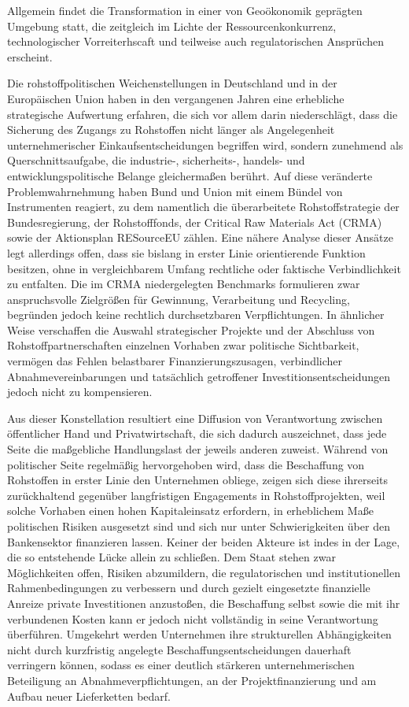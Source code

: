 \documentclass[12pt,a4paper,oneside]{book} %
\begin{document}
{Allgemein findet die Transformation in einer von Geoökonomik geprägten Umgebung statt, die zeitgleich im Lichte der Ressourcenkonkurrenz, technologischer Vorreiterhscaft und teilweise auch regulatorischen Ansprüchen erscheint.

Die rohstoffpolitischen Weichenstellungen in Deutschland und in der Europäischen Union haben in den vergangenen Jahren eine erhebliche strategische Aufwertung erfahren, die sich vor allem darin niederschlägt, dass die Sicherung des Zugangs zu Rohstoffen nicht länger als Angelegenheit unternehmerischer Einkaufsentscheidungen begriffen wird, sondern zunehmend als Querschnittsaufgabe, die industrie-, sicherheits-, handels- und entwicklungspolitische Belange gleichermaßen berührt. Auf diese veränderte Problemwahrnehmung haben Bund und Union mit einem Bündel von Instrumenten reagiert, zu dem namentlich die überarbeitete Rohstoffstrategie der Bundesregierung, der Rohstofffonds, der Critical Raw Materials Act (CRMA) sowie der Aktionsplan RESourceEU zählen. Eine nähere Analyse dieser Ansätze legt allerdings offen, dass sie bislang in erster Linie orientierende Funktion besitzen, ohne in vergleichbarem Umfang rechtliche oder faktische Verbindlichkeit zu entfalten. Die im CRMA niedergelegten Benchmarks formulieren zwar anspruchsvolle Zielgrößen für Gewinnung, Verarbeitung und Recycling, begründen jedoch keine rechtlich durchsetzbaren Verpflichtungen. In ähnlicher Weise verschaffen die Auswahl strategischer Projekte und der Abschluss von Rohstoffpartnerschaften einzelnen Vorhaben zwar politische Sichtbarkeit, vermögen das Fehlen belastbarer Finanzierungszusagen, verbindlicher Abnahmevereinbarungen und tatsächlich getroffener Investitionsentscheidungen jedoch nicht zu kompensieren.

Aus dieser Konstellation resultiert eine Diffusion von Verantwortung zwischen öffentlicher Hand und Privatwirtschaft, die sich dadurch auszeichnet, dass jede Seite die maßgebliche Handlungslast der jeweils anderen zuweist. Während von politischer Seite regelmäßig hervorgehoben wird, dass die Beschaffung von Rohstoffen in erster Linie den Unternehmen obliege, zeigen sich diese ihrerseits zurückhaltend gegenüber langfristigen Engagements in Rohstoffprojekten, weil solche Vorhaben einen hohen Kapitaleinsatz erfordern, in erheblichem Maße politischen Risiken ausgesetzt sind und sich nur unter Schwierigkeiten über den Bankensektor finanzieren lassen. Keiner der beiden Akteure ist indes in der Lage, die so entstehende Lücke allein zu schließen. Dem Staat stehen zwar Möglichkeiten offen, Risiken abzumildern, die regulatorischen und institutionellen Rahmenbedingungen zu verbessern und durch gezielt eingesetzte finanzielle Anreize private Investitionen anzustoßen, die Beschaffung selbst sowie die mit ihr verbundenen Kosten kann er jedoch nicht vollständig in seine Verantwortung überführen. Umgekehrt werden Unternehmen ihre strukturellen Abhängigkeiten nicht durch kurzfristig angelegte Beschaffungsentscheidungen dauerhaft verringern können, sodass es einer deutlich stärkeren unternehmerischen Beteiligung an Abnahmeverpflichtungen, an der Projektfinanzierung und am Aufbau neuer Lieferketten bedarf.

}
\end{document}
